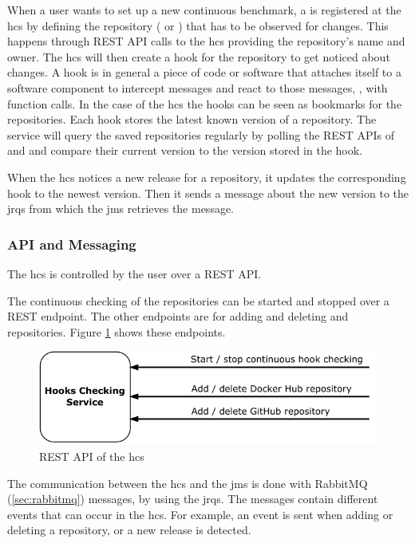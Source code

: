 When a user wants to set up a new continuous benchmark, a \ts{} is registered at the \ac{hcs} by defining the repository (\gh{} or \dockh{}) that has to be observed for changes.
This happens through REST API calls to the \ac{hcs} providing the repository's name and owner.
The \ac{hcs} will then create a hook for the repository to get noticed about changes.
A hook is in general a piece of code or software that attaches itself to a software component to intercept messages and react to those messages, \eg, with function calls.
In the case of the \ac{hcs} the hooks can be seen as bookmarks for the repositories.
Each hook stores the latest known version of a repository.
The service will query the saved repositories regularly by polling the REST APIs of \gh{} and \dockh{} and compare their current version to the version stored in the hook.

When the \ac{hcs} notices a new release for a repository, it updates the corresponding hook to the newest version.
Then it sends a message about the new version to the \aclp{jrq} from which the \acl{jms} retrieves the message.

\subsubsection{API and Messaging}
\label{sec:hooks_api}
The \ac{hcs} is controlled by the user over a REST API.

The continuous checking of the repositories can be started and stopped over a REST endpoint.
The other endpoints are for adding and deleting \gh{} and \dockh{} repositories.
Figure \ref{fig:rest_apis_approach_hcs} shows these endpoints.
\begin{figure}[tbph]
	\centering
	\includegraphics[width=.57\textwidth]{figures/rest-apis-approach-hcs.pdf}
	\caption{REST API of the \acl{hcs}}
	\label{fig:rest_apis_approach_hcs}
\end{figure}

The communication between the \ac{hcs} and the \acl{jms} is done with RabbitMQ (\ref{sec:rabbitmq}) messages, by using the \aclp{jrq}.
The messages contain different events that can occur in the \ac{hcs}.
For example, an event is sent when adding or deleting a repository, or a new release is detected.


